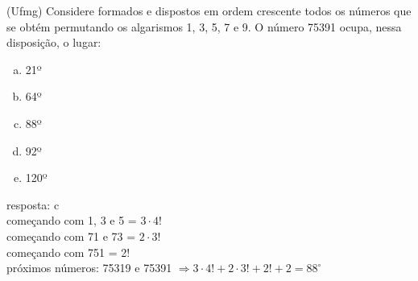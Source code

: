 \begin{ex}
 (Ufmg) Considere formados e dispostos  em ordem crescente todos os números que se obtém permutando os algarismos 1, 3, 5, 7 e 9. O número 75391 ocupa, nessa disposição, o lugar:
   \begin{enumerate}[(a)]
   \item 21º
   \item 64º
   \item 88º
   \item 92º
   \item 120º
   \end{enumerate}
     \begin{sol}
       resposta: c \\
       começando com 1, 3 e 5 = $3\cdot4!$ \\
       começando com 71 e 73 = $2\cdot3! $ \\
       começando com 751 = 2!\\
       próximos números: 75319 e 75391 \hspace{0,5cm}
       $\Longrightarrow 3\cdot4!+2\cdot3!+2!+2 = 88^ {\circ}$
     \end{sol}
\end{ex}